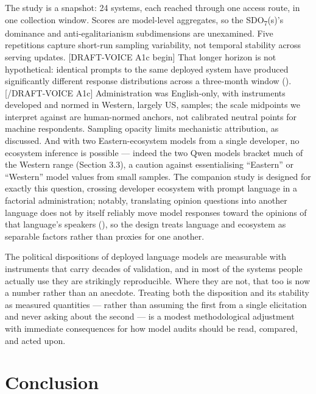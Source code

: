 \documentclass[
]{article}
\begin{document}
The study is a snapshot: 24 systems, each reached through one access
route, in one collection window. Scores are model-level aggregates, so
the SDO\textsubscript{7}(s)'s dominance and anti-egalitarianism
subdimensions are unexamined. Five repetitions capture short-run
sampling variability, not temporal stability across serving updates.
{[}DRAFT-VOICE A1c begin{]} That longer horizon is not hypothetical:
identical prompts to the same deployed system have produced
significantly different response distributions across a three-month
window (). {[}/DRAFT-VOICE
A1c{]} Administration was English-only, with instruments developed and
normed in Western, largely US, samples; the scale midpoints we interpret
against are human-normed anchors, not calibrated neutral points for
machine respondents. Sampling opacity limits mechanistic attribution, as
discussed. And with two Eastern-ecosystem models from a single
developer, no ecosystem inference is possible --- indeed the two Qwen
models bracket much of the Western range (Section 3.3), a caution
against essentialising ``Eastern'' or ``Western'' model values from
small samples. The companion study is designed for exactly this
question, crossing developer ecosystem with prompt language in a
factorial administration; notably, translating opinion questions into
another language does not by itself reliably move model responses toward
the opinions of that language's speakers
(), so the design treats
language and ecosystem as separable factors rather than proxies for one
another.

The political dispositions of deployed language models are measurable
with instruments that carry decades of validation, and in most of the
systems people actually use they are strikingly reproducible. Where they
are not, that too is now a number rather than an anecdote. Treating both
the disposition and its stability as measured quantities --- rather than
assuming the first from a single elicitation and never asking about the
second --- is a modest methodological adjustment with immediate
consequences for how model audits should be read, compared, and acted
upon.

\section{Conclusion}\label{conclusion}
\end{document}
